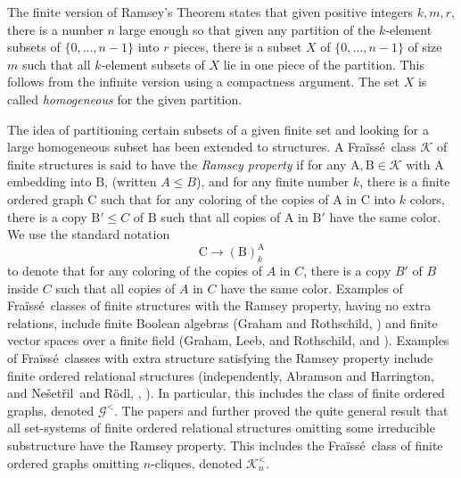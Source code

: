 \documentclass{amsart}
\theoremstyle{remark}
\theoremstyle{definition}
\theoremstyle{remark}
\newcommand{\A}{\mathrm{A}}
\newcommand{\B}{\mathrm{B}}
\newcommand{\C}{\mathrm{C}}
\newcommand{\ra}{\rightarrow}
\newcommand{\Nesetril}{Ne{\v{s}}et{\v{r}}il}
\newcommand{\Rodl}{R{\"{o}}dl}
\newcommand{\Fraisse}{Fra{\"{i}}ss{\'{e}}}
\begin{document}
The finite version of Ramsey's Theorem states that given positive integers $k,m,r$, there is a number $n$ large enough so that
given any partition of the $k$-element subsets of $\{0,\dots, n-1\}$ into $r$ pieces,
there is a subset $X$ of $\{0,\dots,n-1\}$ of size $m$ such that all $k$-element subsets of $X$ lie in one piece of the partition.
This follows from the infinite version using a  compactness argument.
The set $X$ is called {\em homogeneous} for the given partition.



The idea of partitioning  certain subsets of a given finite  set and looking for a large homogeneous subset has been extended to structures.
A \Fraisse\ class $\mathcal{K}$ of finite structures is said to have the {\em Ramsey property}
if for any $\A,\B\in\mathcal{K}$ with $\A$ embedding into $\B$,
 (written $A\le B$), and for any finite number $k$,
there is a finite ordered graph $\C$ such that
for any coloring of the copies of $\A$ in $\C$ into $k$ colors, there is a copy $\B'\le C$ of $\B$  such that all copies of $\A$ in $\B'$ have the same color.
We use the standard notation
\begin{equation}\C\ra (\B)^{\A}_k
\end{equation}
to denote that for any coloring of the copies of $A$ in $C$, there is a copy $B'$ of $B$ inside $C$ such that all copies of $A$ in $C$ have the same color.
Examples of \Fraisse\ classes of finite structures
 with the Ramsey property, having no extra relations, include
finite Boolean algebras (Graham and Rothschild, \cite{Graham/Rothschild71}) and
finite vector spaces over a finite field (Graham, Leeb, and Rothschild, \cite{Graham/Leeb/Rothschild72} and
\cite{Graham/Leeb/Rothschild73}).
Examples  of \Fraisse\ classes with extra structure satisfying the Ramsey  property include
 finite  ordered relational structures  (independently, Abramson and Harrington, \cite{Abramson/Harringon78} and \Nesetril\ and \Rodl, \cite{Nesetril/Rodl77}, \cite{Nesetril/Rodl83}).
In particular, this includes the class of finite ordered graphs, denoted $\mathcal{G}^{<}$.
The papers \cite{Nesetril/Rodl77} and \cite{Nesetril/Rodl83} further proved  the quite general result that  all set-systems of  finite ordered relational structures omitting some irreducible substructure have the Ramsey property.
This includes
 the \Fraisse\ class of finite ordered graphs omitting $n$-cliques, denoted $\mathcal{K}_n^{<}$.
\end{document}
